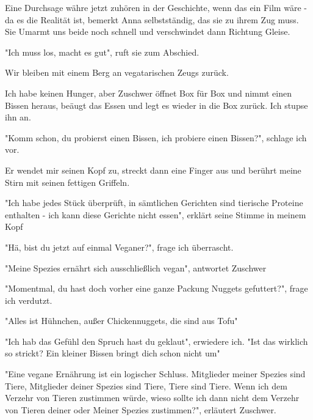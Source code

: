 \documentclass[11pt]{article}
\begin{document}
\noindent Eine Durchsage währe jetzt zuhören in der Geschichte, wenn
das ein Film wäre - da es die Realität ist, bemerkt Anna
selbstständig, das sie zu ihrem Zug muss. Sie Umarmt uns beide noch
schnell und verschwindet dann Richtung Gleise.
\begin{center}
"Ich muss los, macht es gut", ruft sie zum Abschied.
\end{center}
Wir bleiben mit einem Berg an vegatarischen Zeugs zurück.

\noindent Ich habe keinen Hunger, aber Zuschwer öffnet Box für Box und
nimmt einen Bissen heraus, beäugt das Essen und legt es wieder in die
Box zurück. Ich stupse ihn an.
\begin{center}
"Komm schon, du probierst einen Bissen, ich probiere einen Bissen?",
schlage ich vor.
\end{center}
Er wendet mir seinen Kopf zu, streckt dann eine Finger aus und berührt
meine Stirn mit seinen fettigen Griffeln.
\begin{center}
"Ich habe jedes Stück überprüft, in sämtlichen Gerichten sind
tierische Proteine enthalten - ich kann diese Gerichte nicht essen",
erklärt seine Stimme in meinem Kopf
\end{center}
\begin{center}
"Hä, bist du jetzt auf einmal Veganer?", frage ich überrascht.
\end{center}
\begin{center}
"Meine Spezies ernährt sich ausschließlich vegan", antwortet Zuschwer
\end{center}
\begin{center}
"Momentmal, du hast doch vorher eine ganze Packung Nuggets
gefuttert?", frage ich verdutzt.
\end{center}
\begin{center}
"Alles ist Hühnchen, außer Chickennuggets, die sind aus Tofu"
\end{center}
\begin{center}
"Ich hab das Gefühl den Spruch hast du geklaut", erwiedere ich.
"Ist das wirklich so strickt? Ein kleiner Bissen bringt dich schon
nicht um"
\end{center}
\begin{center}
"Eine vegane Ernährung ist ein logischer Schluss. Mitglieder meiner
Spezies sind Tiere, Mitglieder deiner Spezies sind Tiere, Tiere sind
Tiere. Wenn ich dem Verzehr von Tieren zustimmen würde, wieso sollte
ich dann nicht dem Verzehr von Tieren deiner oder Meiner Spezies
zustimmen?", erläutert Zuschwer.
\end{center}
\end{document}
